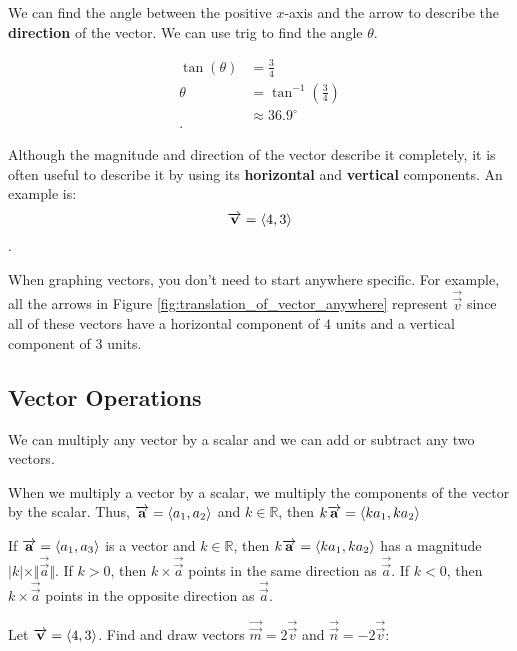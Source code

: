 We can find the angle between the positive $x$-axis and the arrow to describe
the \textbf{direction} of the vector. We can use trig to find the angle
$\theta$.

\begin{align*}
  \tan (\theta) &= \frac{3}{4} \\
         \theta &= \tan^{-1} \left(\frac{3}{4}\right) \\
                &\approx 36.9^{\circ} \\
.\end{align*}

Although the magnitude and direction of the vector describe it completely, it
is often useful to describe it by using its \textbf{horizontal} and
\textbf{vertical} components. An example is:
\[ \overrightarrow{\mathbf{v}} = \braket{4,3} \].

When graphing vectors, you don't need to start anywhere specific. For example,
all the arrows in Figure \ref{fig:translation_of_vector_anywhere} represent
$\overrightarrow{\vec{v}}$ since all of these vectors have a horizontal
component of $4$ units and a vertical component of $3$ units.

\subsection*{Vector Operations}
\label{sub_sec:vector_operations}

We can multiply any vector by a scalar and we can add or subtract any two
vectors.

When we multiply a vector by a scalar, we multiply the components of the vector
by the scalar. Thus, $\overrightarrow{\mathbf{a}} = \braket{a_1,a_2}$ and $k \in
\mathbb{R}$, then $k\overrightarrow{\mathbf{a}} = \braket{ka_1,ka_2}$ 

\begin{theorem}
  If $\overrightarrow{\mathbf{a}} = \braket{a_1,a_3}$ is a vector and $k \in
  \mathbb{R}$, then $k\overrightarrow{\mathbf{a}} = \braket{ka_1,ka_2}$ has a
  magnitude $\vert k \vert \times \Vert \overrightarrow{\vec{a}} \Vert$.
  If $k > 0$, then $k \times \overrightarrow{\vec{a}}$ points in the same
  direction as $\overrightarrow{\vec{a}}$. If $k < 0$, then $k \times
  \overrightarrow{\vec{a}}$ points in the opposite direction as
  $\overrightarrow{\vec{a}}$.
\end{theorem}

\begin{exc}
  \label{exc:multiply_vectors_by_scalers}

  Let $\overrightarrow{\mathbf{v}} = \braket{4,3}$. Find and draw vectors
  $\overrightarrow{\vec{m}} = 2 \overrightarrow{\vec{v}}$ and
  $\overrightarrow{\vec{n}} = -2\overrightarrow{\vec{v}}$:
\end{exc}


\newpage
